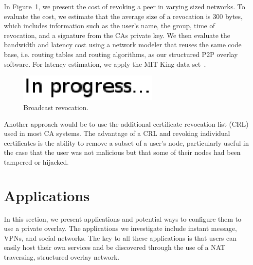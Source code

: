 \documentclass[conference]{IEEEtran}
\begin{document}
In Figure~\ref{fig:broadcast_revocation}, we present the cost of revoking a
peer in varying sized networks.  To evaluate the cost, we estimate that the
average size of a revocation is 300 bytes, which includes information such
as the user's name, the group, time of revocation, and a signature from the
CAs private key.  We then evaluate the bandwidth and latency cost using a
network modeler that reuses the same code base, i.e. routing tables and routing
algorithms, as our structured P2P overlay software.  For latency estimation,
we apply the MIT King data set~\cite{king_data}.

\begin{figure}[h]
\centering
\includegraphics[width=2.75in]{in_progress.eps}
\caption{Broadcast revocation.}
\label{fig:broadcast_revocation}
\end{figure}

Another approach would be to use the additional certificate revocation list
(CRL) used in most CA systems.  The advantage of a CRL and revoking individual
certificates is the ability to remove a subset of a user's node, particularly
useful in the case that the user was not malicious but that some of their nodes
had been tampered or hijacked.

\section{Applications}
\label{applications}
In this section, we present applications and potential ways to configure them
to use a private overlay.  The applications we investigate include instant
message, VPNs, and social networks.  The key to all these applications is that
users can easily host their own services and be discovered through the use of
a NAT traversing, structured overlay network.
\end{document}
